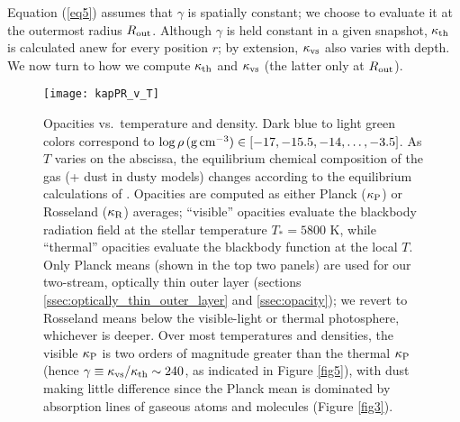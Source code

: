 \documentclass[fleqn,useAMS,usenatbib]{mnras}
\begin{document}
Equation (\ref{eq5}) assumes that $\gamma$ is spatially constant;
we choose to evaluate it at the outermost radius $R_{\rm out}$.
Although $\gamma$ is held constant in a given
snapshot, $\kappa_{\rm th}$ is calculated anew for every position $r$;
by extension, $\kappa_{\rm vs}$ also varies with depth.
We now turn to how we compute $\kappa_{\rm th}$ and $\kappa_{\rm vs}$
(the latter only at $R_{\rm out}$).

\begin{figure}
    \centering
    \texttt{[image: kapPR\_v\_T]}
    \caption{Opacities vs.~temperature and density. 
    Dark blue to light green colors correspond
    to $\log \rho \,({\rm g\,cm^{-3}}) \in [-17, -15.5, -14, \dots, -3.5]$.
    As $T$ varies on the abscissa, the equilibrium chemical composition 
    of the gas (+ dust in dusty models) changes according to the equilibrium 
    calculations of \citet{ferguson05}. Opacities are computed as either
    Planck ($\kappa_{\rm P}$) or Rosseland ($\kappa_{\rm R}$) averages;
    ``visible'' opacities evaluate the blackbody radiation field
    at the stellar temperature $T_\ast = 5800$ K, while ``thermal'' opacities
    evaluate the blackbody function at the local $T$.
    Only Planck means (shown in the top two panels) are used for our
    two-stream, optically thin outer layer (sections
    \ref{ssec:optically_thin_outer_layer} and
    \ref{ssec:opacity}); we revert to Rosseland means below the visible-light
    or thermal photosphere, whichever is deeper.
    Over most temperatures and densities, the visible $\kappa_{\rm P}$
    is two orders of magnitude greater than the thermal $\kappa_{\rm P}$
    (hence $\gamma \equiv \kappa_{\rm vs}/\kappa_{\rm th} \sim 240$,
    as indicated in Figure \ref{fig5}), with
    dust making little difference since the Planck mean is dominated by 
    absorption lines of gaseous atoms and molecules (Figure \ref{fig3}).}
    \label{fig2}
\end{figure}
\end{document}
